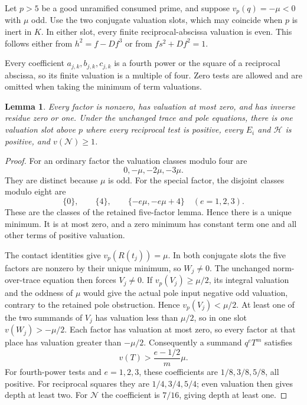 \documentclass[11pt,a4paper]{article}
\newtheorem{lemma}[proposition]{Lemma}
\begin{document}
Let $p>5$ be a good unramified consumed prime, and suppose
$v_p(q)=-\mu<0$ with $\mu$ odd. Use the two conjugate valuation
slots, which may coincide when $p$ is inert in $K$. In either slot, every
finite reciprocal-abscissa valuation is even. This follows either
from $h^2=f-Df^3$ or from $fs^2+Df^2=1$.

Every coefficient $a_{j,k},b_{j,k},c_{j,k}$ is a fourth power or
the square of a reciprocal abscissa, so its finite valuation is a
multiple of four. Zero tests are allowed and are omitted when taking
the minimum of term valuations.

\begin{lemma}
Every factor is nonzero, has valuation at most zero, and has inverse
residue zero or one. Under the unchanged trace and pole equations,
there is one valuation slot above $p$ where every reciprocal test is positive,
every $E_i$ and $\mathcal H$ is positive, and $v(\mathcal N)\ge1$.
\end{lemma}
\begin{proof}
For an ordinary factor the valuation classes modulo four are
\[
                     0,-\mu,-2\mu,-3\mu.
\]
They are distinct because $\mu$ is odd. For the special factor,
the disjoint classes modulo eight are
\[
 \{0\},\qquad\{4\},\qquad
 \{-e\mu,-e\mu+4\}\quad(e=1,2,3).
\]
These are the classes of the retained five-factor lemma.
Hence there is a unique minimum.
It is at most zero, and a zero minimum has constant term one and
all other terms of positive valuation.

The contact identities give $v_p(R(t_j))=\mu$. In both conjugate slots the
five factors are nonzero by their unique minimum, so $W_j\ne0$.
The unchanged norm-over-trace equation then forces $V_j\ne0$.
If $v_p(V_j)\ge\mu/2$, its integral valuation and the oddness of
$\mu$ would give the actual pole input negative odd valuation,
contrary to the retained pole obstruction. Hence $v_p(V_j)<\mu/2$.
At least one of the two summands of $V_j$ has valuation less than
$\mu/2$, so in one slot $v(W_j)>-\mu/2$. Each factor has valuation
at most zero, so every factor at that place has valuation greater
than $-\mu/2$. Consequently a summand $q^eT^m$ satisfies
\[
                          v(T)>\frac{e-1/2}{m}\mu.
\]
For fourth-power tests and $e=1,2,3$, these coefficients are
$1/8,3/8,5/8$, all positive. For reciprocal squares they are
$1/4,3/4,5/4$; even valuation then gives depth at least two.
For $\mathcal N$ the coefficient is $7/16$, giving depth at least one.
\end{proof}
\end{document}
